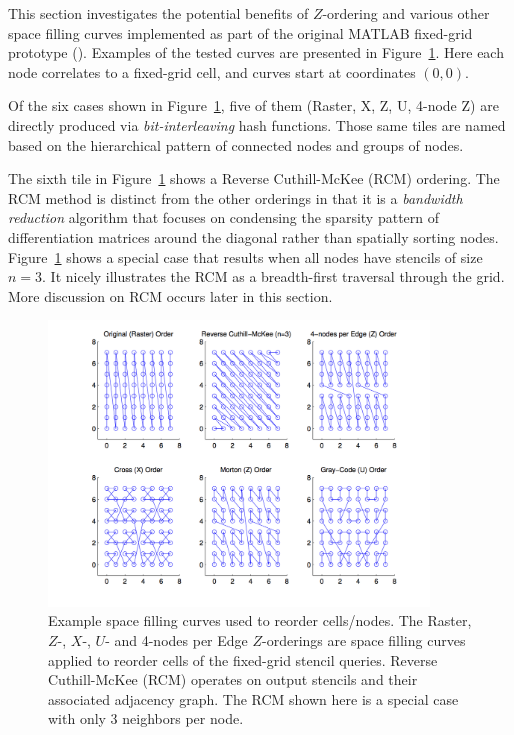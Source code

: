 \documentclass{report}
\begin{document}
This section investigates the potential benefits of $Z$-ordering and various other space filling curves implemented as part of the original MATLAB fixed-grid prototype (\cite{BolligRBFFixedGrid}). Examples of the tested curves are presented in Figure~\ref{fig:orderings}. Here each node correlates to a fixed-grid cell, and curves start at coordinates $(0,0)$. 

Of the six cases shown in Figure~\ref{fig:orderings}, five of them (Raster, X, Z, U, 4-node Z) are directly produced via \emph{bit-interleaving} hash functions. Those same tiles are named based on the hierarchical pattern of connected nodes and groups of nodes. 

The sixth tile in Figure~\ref{fig:orderings} shows a Reverse Cuthill-McKee (RCM) ordering. The RCM method is distinct from the other orderings in that it is a \emph{bandwidth reduction} algorithm that focuses on condensing the sparsity pattern of differentiation matrices around the diagonal rather than spatially sorting nodes. Figure~\ref{fig:orderings} shows a special case that results when all nodes have stencils of size $n=3$. It nicely illustrates the RCM as a breadth-first traversal through the grid. More discussion on RCM occurs later in this section. 
\begin{figure}
\centering
\includegraphics[width=0.9\textwidth]{rbffd_methods_content/hashing/node_orderings.png} 
\caption{Example space filling curves used to reorder cells/nodes. The Raster, $Z$-, $X$-, $U$- and 4-nodes per Edge $Z$-orderings are space filling curves applied to reorder cells of the fixed-grid stencil queries. Reverse Cuthill-McKee (RCM) operates on output stencils and their associated adjacency graph. The RCM shown here is a special case with only 3 neighbors per node.}
\label{fig:orderings}
\end{figure}
\end{document}
